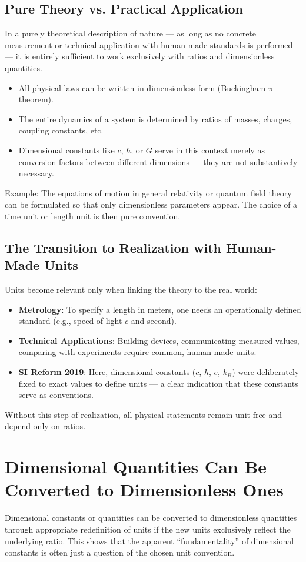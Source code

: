 	\subsection{Pure Theory vs. Practical Application}
	In a purely theoretical description of nature --- as long as no concrete measurement or technical application with human-made standards is performed --- it is entirely sufficient to work exclusively with ratios and dimensionless quantities.
	\begin{itemize}
		\item All physical laws can be written in dimensionless form (Buckingham $\pi$-theorem).
		\item The entire dynamics of a system is determined by ratios of masses, charges, coupling constants, etc.
		\item Dimensional constants like $c$, $\hbar$, or $G$ serve in this context merely as conversion factors between different dimensions --- they are not substantively necessary.
	\end{itemize}
	Example: The equations of motion in general relativity or quantum field theory can be formulated so that only dimensionless parameters appear. The choice of a time unit or length unit is then pure convention.
	
	\subsection{The Transition to Realization with Human-Made Units}
	Units become relevant only when linking the theory to the real world:
	\begin{itemize}
		\item \textbf{Metrology}: To specify a length in meters, one needs an operationally defined standard (e.g., speed of light $c$ and second).
		\item \textbf{Technical Applications}: Building devices, communicating measured values, comparing with experiments require common, human-made units.
		\item \textbf{SI Reform 2019}: Here, dimensional constants ($c$, $\hbar$, $e$, $k_B$) were deliberately fixed to exact values to define units --- a clear indication that these constants serve as conventions.
	\end{itemize}
	Without this step of realization, all physical statements remain unit-free and depend only on ratios.
	
	\section{Dimensional Quantities Can Be Converted to Dimensionless Ones}
	Dimensional constants or quantities can be converted to dimensionless quantities through appropriate redefinition of units if the new units exclusively reflect the underlying ratio. This shows that the apparent ``fundamentality'' of dimensional constants is often just a question of the chosen unit convention.
	
